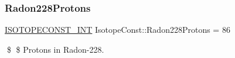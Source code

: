 \subsubsection{\texorpdfstring{Radon228\+Protons}{Radon228Protons}}
{\footnotesize\ttfamily \mbox{\hyperlink{group___isotope_const-_macros_ga5f18360b3e99483a35c32d789e62621c}{I\+S\+O\+T\+O\+P\+E\+C\+O\+N\+S\+T\+\_\+\+I\+NT}} Isotope\+Const\+::\+Radon228\+Protons = 86}

\$ \$ Protons in Radon-\/228. 